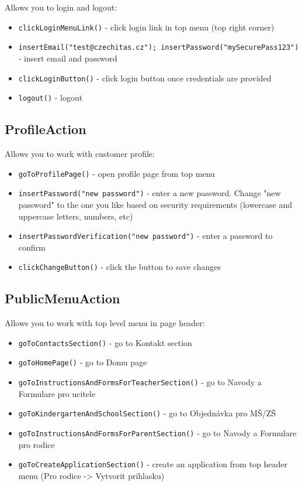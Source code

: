 \documentclass{article}
\let\oldtexttt\texttt
\renewcommand{\texttt}[1]{%
  \colorbox{gray!30}{\oldtexttt{#1}}%
}
\begin{document}
Allows you to login and logout:
\begin{itemize}
  \item \texttt{clickLoginMenuLink()} - click login link in top menu (top right corner)
  \item \texttt{insertEmail("test@czechitas.cz"); insertPassword("mySecurePass123")} - insert email and password
  \item \texttt{clickLoginButton()} - click login button once credentials are provided
  \item \texttt{logout()} - logout
\end{itemize}

\subsection*{ProfileAction}

Allows you to work with customer profile:
\begin{itemize}
  \item \texttt{goToProfilePage()} - open profile page from top menu
  \item \texttt{insertPassword("new password")} - enter a new password. Change "new password" to the one you like based on security requirements (lowercase and uppercase letters, numbers, etc)
  \item \texttt{insertPasswordVerification("new password")} - enter a password to confirm
  \item \texttt{clickChangeButton()} - click the button to save changes
\end{itemize}

\subsection*{PublicMenuAction}

Allows you to work with top level menu in page header:
\begin{itemize}
  \item \texttt{goToContactsSection()} - go to Kontakt section
  \item \texttt{goToHomePage()} - go to Domu page
  \item \texttt{goToInstructionsAndFormsForTeacherSection()} - go to Navody a Formulare pro ucitele
  \item \texttt{goToKindergartenAndSchoolSection()} - go to Objednávka pro MŠ/ZŠ
  \item \texttt{goToInstructionsAndFormsForParentSection()} - go to Navody a Formulare pro rodice
  \item \texttt{goToCreateApplicationSection()} - create an application from top header menu (Pro rodice -> Vytvorit prihlasku)
\end{itemize}
\end{document}
